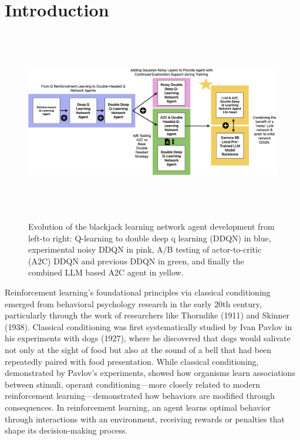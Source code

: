 \documentclass[compsoc]{IEEEtran}
\begin{document}
\maketitle
\IEEEdisplaynontitleabstractindextext


\IEEEpeerreviewmaketitle



\section{Introduction}\label{sec:introduction}

\begin{figure}[h]
\centering
{\includegraphics[width=\textwidth, height=8cm]{./fig/fig1_rl_dqns.png}}
\caption{Evolution of the blackjack learning network agent development from left-to right: Q-learning to double deep q learning (DDQN) in blue, experimental noisy DDQN in pink, A/B testing of actor-to-critic (A2C) DDQN and previous DDQN in green, and finally the combined LLM based A2C agent in yellow.}
\end{figure}


Reinforcement learning's foundational principles via classical conditioning emerged from behavioral psychology research in the early 20th century, particularly through the work of researchers like Thorndike (1911) and Skinner (1938). Classical conditioning was first systematically studied by Ivan Pavlov in his experiments with dogs (1927), where he discovered that dogs would salivate not only at the sight of food but also at the sound of a bell that had been repeatedly paired with food presentation. While classical conditioning, demonstrated by Pavlov's experiments, showed how organisms learn associations between stimuli, operant conditioning—more closely related to modern reinforcement learning—demonstrated how behaviors are modified through consequences. In reinforcement learning, an agent learns optimal behavior through interactions with an environment, receiving rewards or penalties that shape its decision-making process. 
\end{document}
